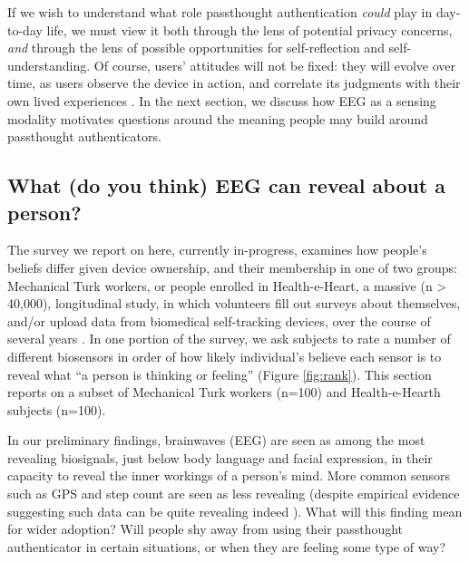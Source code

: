 \documentclass[sigconf]{acmart}
\begin{document}
If we wish to understand what role passthought authentication \emph{could} play in day-to-day life,
we must view it both through the lens of potential privacy concerns, \emph{and} through the lens of possible opportunities for self-reflection and self-understanding. 
Of course, users' attitudes will not be fixed: they will evolve over time, as users observe the device in action, and correlate its judgments with their own lived experiences \cite{Nafus2016}.
In the next section, we discuss how EEG as a sensing modality motivates questions around the meaning people may build around passthought authenticators.

\subsection{What (do you think) EEG can reveal about a person?}
\label{sec:org230b3b8}

The survey we report on here, currently in-progress, examines how people's beliefs differ given device ownership, and their membership in one of two groups: Mechanical Turk workers, or people enrolled in Health-e-Heart, a massive (n > 40,000), longitudinal study, in which volunteers fill out surveys about themselves, and/or upload data from biomedical self-tracking devices, over the course of several years \cite{Estrin2010a}.
In one portion of the survey, we ask subjects to rate a number of different biosensors in order of how likely individual's believe each sensor is to reveal what ``a person is thinking or feeling'' (Figure \ref{fig:rank}).
This section reports on a subset of Mechanical Turk workers (n=100) and Health-e-Hearth subjects (n=100).

In our preliminary findings, brainwaves (EEG) are seen as among the most revealing biosignals, just below body language and facial expression, in their capacity to reveal the inner workings of a person's mind. 
More common sensors such as GPS and step count are seen as less revealing (despite empirical evidence suggesting such data can be quite revealing indeed \cite{Canzian2015}).
What will this finding mean for wider adoption? 
Will people shy away from using their passthought authenticator in certain situations, or when they are feeling some type of way?
\end{document}
